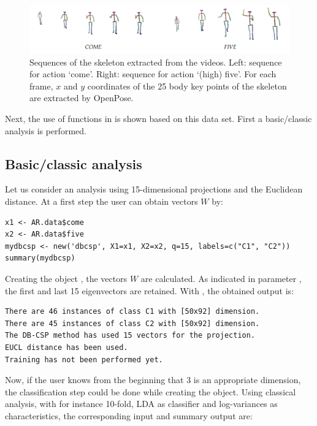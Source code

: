 \begin{figure}[htbp!]
    \centering
    \includegraphics[width=\textwidth]{come_five.pdf}
    \caption{Sequences of the skeleton extracted from the videos. Left: sequence for action `come'. Right: sequence for action `(high) five'. For each frame, $x$ and $y$ coordinates of the 25 body key points of the skeleton are extracted by OpenPose. }
    \label{fig:come-five}
\end{figure}

Next, the use of functions in  is shown based on this data set. First a basic/classic analysis is performed.

\subsection{Basic/classic analysis}

Let us consider an analysis using 15-dimensional projections and the Euclidean distance. At a first step the user can obtain  vectors $W$ by:

\begin{verbatim}
x1 <- AR.data$come
x2 <- AR.data$five
mydbcsp <- new('dbcsp', X1=x1, X2=x2, q=15, labels=c("C1", "C2"))
summary(mydbcsp)
\end{verbatim}

Creating the object , the vectors $W$ are calculated. As indicated in parameter , the first and last 15 eigenvectors are retained. With , the obtained output is:

\begin{verbatim}
There are 46 instances of class C1 with [50x92] dimension.
There are 45 instances of class C2 with [50x92] dimension.
The DB-CSP method has used 15 vectors for the projection.
EUCL distance has been used.
Training has not been performed yet.
\end{verbatim}

Now, if the user knows from the beginning that 3 is an appropriate dimension, the classification step could be done while creating the object.  Using classical analysis, with for instance 10-fold, LDA as classifier and log-variances as characteristics, the corresponding input and summary output are:

